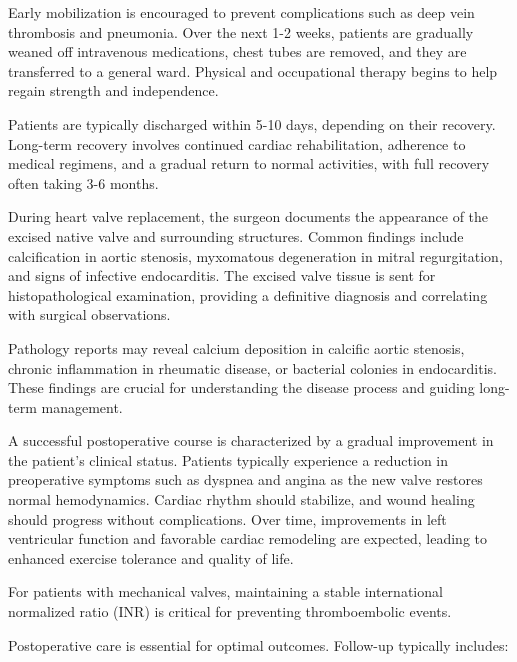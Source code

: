 Early mobilization is encouraged to prevent complications such as deep vein thrombosis and pneumonia. Over the next 1-2 weeks, patients are gradually weaned off intravenous medications, chest tubes are removed, and they are transferred to a general ward. Physical and occupational therapy begins to help regain strength and independence.

Patients are typically discharged within 5-10 days, depending on their recovery. Long-term recovery involves continued cardiac rehabilitation, adherence to medical regimens, and a gradual return to normal activities, with full recovery often taking 3-6 months.

During heart valve replacement, the surgeon documents the appearance of the excised native valve and surrounding structures. Common findings include calcification in aortic stenosis, myxomatous degeneration in mitral regurgitation, and signs of infective endocarditis. The excised valve tissue is sent for histopathological examination, providing a definitive diagnosis and correlating with surgical observations. 

Pathology reports may reveal calcium deposition in calcific aortic stenosis, chronic inflammation in rheumatic disease, or bacterial colonies in endocarditis. These findings are crucial for understanding the disease process and guiding long-term management.

A successful postoperative course is characterized by a gradual improvement in the patient's clinical status. Patients typically experience a reduction in preoperative symptoms such as dyspnea and angina as the new valve restores normal hemodynamics. Cardiac rhythm should stabilize, and wound healing should progress without complications. Over time, improvements in left ventricular function and favorable cardiac remodeling are expected, leading to enhanced exercise tolerance and quality of life.

For patients with mechanical valves, maintaining a stable international normalized ratio (INR) is critical for preventing thromboembolic events.

Postoperative care is essential for optimal outcomes. Follow-up typically includes:

